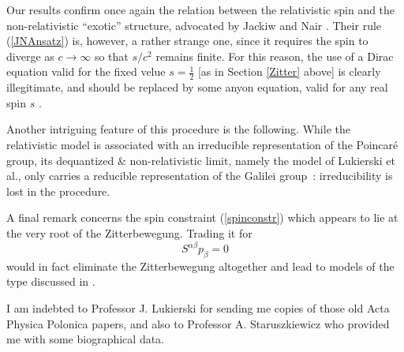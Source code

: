 \documentclass[a4paper,11pt]{article}
\newcommand{\half}{{\scriptstyle{\frac{1}{2}}}}
\def\parag{\hfil\break} %
\def\kikezd{\parag\underbar}
\begin{document}
Our results confirm once again the relation between the relativistic
spin and the non-relativistic ``exotic'' structure, advocated
  by Jackiw and Nair \cite{JaNa}.
Their rule (\ref{JNAnsatz}) is,
however, a rather strange one, since it requires
the spin to diverge as $c\to\infty$
so that $s/c^2$ remains finite.
For this reason, the use of a Dirac equation valid for the
fixed velue $s=\half$
[as in Section \ref{Zitter} above] is clearly illegitimate, and should
be replaced by some anyon equation,
  valid for any real spin $s$ \cite{aneq}.


Another intriguing feature of this procedure is the following.
While the relativistic model is  associated with an
irreducible representation of the Poincar\'e group,
its dequantized \& non-relativistic limit, namely
the model of Lukierski et al., only carries a
reducible representation of the Galilei group~:
irreducibility is lost in the procedure.

A final remark concerns the spin constraint
(\ref{spinconstr}) which appears to lie at
the very root of the Zitterbewegung. Trading it
for
\begin{equation}
     S^{\alpha\beta}p_{\beta}=0
     \label{Pspinconstr}
\end{equation}
would in fact eliminate the Zitterbewegung altogether and
lead to models of the type discussed in \cite{Dixon}.

\kikezd{\bf Acknowledgement.}
I am indebted to Professor
J. Lukierski for sending me
copies of those old Acta Physica Polonica  papers, and
also to Professor A. Staruszkiewicz
who provided me with some biographical data.
\end{document}

